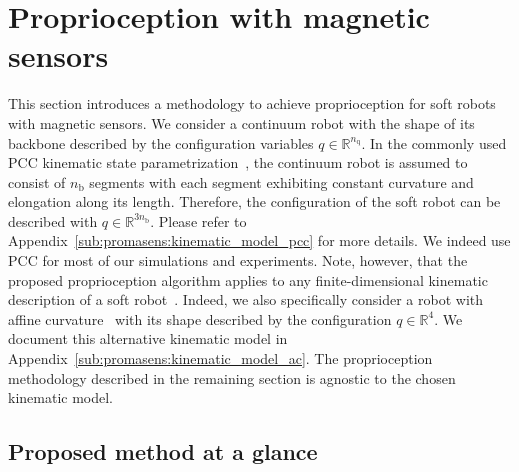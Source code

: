 
\section{Proprioception with magnetic sensors}

This section introduces a methodology to achieve proprioception for soft robots with magnetic sensors.
%
We consider a continuum robot with the shape of its backbone described by the configuration variables $q \in \mathbb{R}^{n_\mathrm{q}}$.
In the commonly used \gls{PCC} kinematic state parametrization~\cite{webster2010design}, the continuum robot is assumed to consist of $n_\mathrm{b}$ segments with each segment exhibiting constant curvature and elongation along its length. Therefore, the configuration of the soft robot can be described with $q \in \mathbb{R}^{3n_\mathrm{b}}$.
Please refer to Appendix~\ref{sub:promasens:kinematic_model_pcc} for more details.
We indeed use PCC for most of our simulations and experiments.
Note, however, that the proposed proprioception algorithm applies to any finite-dimensional kinematic description of a soft robot~\cite{armanini2023soft}.
Indeed, we also specifically consider a robot with affine curvature~\cite{della2020soft, stella2022piecewise_preprint} with its shape described by the configuration $q \in \mathbb{R}^4$. We document this alternative kinematic model in Appendix~\ref{sub:promasens:kinematic_model_ac}.
The proprioception methodology described in the remaining section is agnostic to the chosen kinematic model.

\subsection{Proposed method at a glance}

